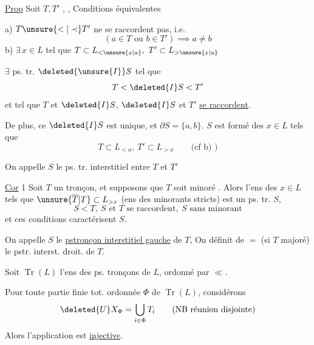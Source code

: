 \uline{Prop} Soit $T,T'$ , , Conditions équivalentes  

a) $T\unsure{<|\prec}T'$  ne se raccordent pas, i.e.
\[
(a\in T\text{ ou }b\in T')\implies a\neq b
\]
\quad b) $\exists\,x\in L$ tel que $T\subset L_{<\unsure{x|a}},\ T'\subset L_{>\unsure{x|a}}$

 $\exists$ ps. tr. $\deleted{\unsure{I}}S$ tel que
\[
T<\deleted{I}S<T'
\]
et tel que $T$ et $\deleted{I}S$, $\deleted{I}S$ et $T'$ \uline{se raccordent}.

De plus, ce $\deleted{I}S$ est unique, et $\partial S=\{a,b\}$. $S$ est formé des $x\in L$ tels que
\[
T\subset L_{<a},\ T'\subset L_{>x}\qquad\text{(cf b) )}
\]

On appelle $S$ le ps. tr. interstitiel entre $T$ et $T'$

\uline{Cor} 1 Soit $T$ un tronçon, et supposons que $T$ soit minoré . Alors l'ens des   $x\in L$ tels que $\unsure{\overline T|T}\subset L_{>x}$ (ens des minorants stricts) est un  ps. tr. $S$,  
\begingroup
\makeatletter
\tagsleft@true
\makeatother
\[
S<T,\ S\text{ et }T\text{ se raccordent},\ S\text{ sans minorant}\tag*{\(\ast\))}
\]
\endgroup
et ces conditions  caractérisent $S$.

 On appelle $S$ le \uline{pstronçon interstitiel gauche} de $T$, On définit de $=$ (si $T$ majoré) le pstr. interst. droit. de $T$.

Soit $\operatorname{Tr}(L)$ l'ens  des ps. tronçons de $L$, ordonné par $\ll$.

Pour toute partie finie tot. ordonnée $\Phi$ de $\operatorname{Tr}(L)$, considérons
\[
\deleted{U}X_{\Phi}=\bigcup_{i\in\Phi}T_i\qquad\text{(NB réunion disjointe)}
\]
Alors l'application
est \uline{injective}.

